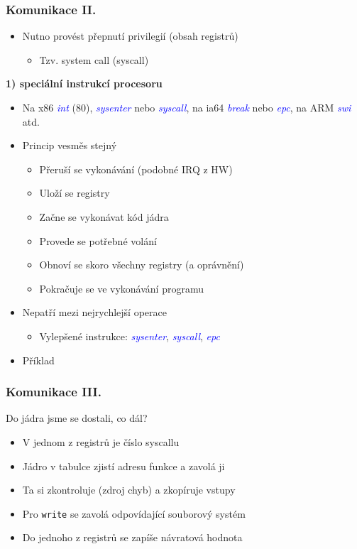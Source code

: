 \documentclass[xcolor=dvipsnames]{beamer}
\let\Oldemph\emph
\renewcommand{\emph}[1]{\textcolor{blue}{\Oldemph{#1}}}
\newcommand{\heading}[1]{\textbf{\textcolor{BurntOrange}{#1}}}
\begin{document}
\begin{frame}
  \frametitle{Komunikace II.}
  \begin{itemize}
  \item Nutno provést přepnutí privilegií (obsah registrů)
  \begin{itemize}
  \item Tzv. system call (syscall)
  \end{itemize}
  \end{itemize}

  \pause

  \heading{1) speciální instrukcí procesoru}
  \begin{itemize}
  \item Na x86 \emph{int} (80), \emph{sysenter} nebo \emph{syscall},
  na ia64 \emph{break} nebo \emph{epc}, na ARM \emph{swi} atd.
  \item Princip vesměs stejný
  \begin{itemize}
  \item Přeruší se vykonávání (podobné IRQ z HW)
  \item Uloží se registry
  \item Začne se vykonávat kód jádra\pause
  \item Provede se potřebné volání
  \item Obnoví se skoro všechny registry (a oprávnění)
  \item Pokračuje se ve vykonávání programu
  \end{itemize}\pause
  \item Nepatří mezi nejrychlejší operace
  \begin{itemize}
  \item Vylepšené instrukce: \emph{sysenter}, \emph{syscall}, \emph{epc}
  \end{itemize}
  \item Příklad
  \end{itemize}

\end{frame}

\begin{frame}
  \frametitle{Komunikace III.}
  Do jádra jsme se dostali, co dál?
  \begin{itemize}
  \item V jednom z registrů je číslo syscallu
  \item Jádro v tabulce zjistí adresu funkce a zavolá ji
  \item Ta si zkontroluje (zdroj chyb) a zkopíruje vstupy
  \item Pro \texttt{write} se zavolá odpovídající souborový systém
  \item Do jednoho z registrů se zapíše návratová hodnota
  \end{itemize}

\end{frame}
\end{document}
